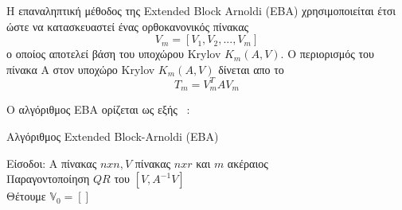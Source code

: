 Η επαναληπτική μέθοδος της \textlatin{Extended Block Arnoldi (EBA)} χρησιμοποιείται έτσι ώστε να κατασκευαστεί ένας ορθοκανονικός πίνακας
\textlatin{
\[ V_m = [V_1, V_2, ..., V_m]\]
} ο οποίος αποτελεί βάση του υποχώρου \textlatin{Krylov $K_m(A, V)$}. Ο περιορισμός του πίνακα Α στον υποχώρο \textlatin{Krylov $K_m(A, V)$} δίνεται απο το
\[ Τ_m = V_{m}^{T}AV_m\]

Ο αλγόριθμος EBA ορίζεται ως εξής ~\cite{bentbib2017some, bentbib2015some, druskin1998extended, heyouni2010extended, simoncini2007new}:

\begin{algorithm}[H]
    \SetAlgoLined
    \caption{ Αλγόριθμος  Extended Block-Arnoldi (EBA)}
    Είσοδοι: A πίνακας $n x n, V$ πίνακας $n x r$ και $m$ ακέραιος\\
    Παραγοντοποίηση $QR$ του $[V, A^{-1}V]$\\
    Θέτουμε $\mathbb{V}_0 = []$\\
\end{algorithm}